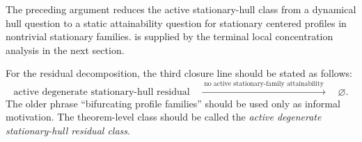 \begin{remark}
\label{rem:R3-final-obligation}
The preceding argument reduces the active stationary-hull class from a dynamical hull question to a static
attainability question for stationary centered profiles in nontrivial stationary
families.
 is supplied by the terminal local
concentration analysis in the next section.
\end{remark}

\begin{remark}
\label{rem:R3-decomposition-replacement}
For the residual decomposition, the third closure line should be stated as follows:
\[
   \text{active degenerate stationary-hull residual}
   \quad\xrightarrow{\;\text{no active stationary-family attainability}\;}\quad
   \varnothing .
\]
The older phrase ``bifurcating profile families'' should be used only as
informal motivation.  The theorem-level class should be called the
\emph{active degenerate stationary-hull residual class}.
\end{remark}
